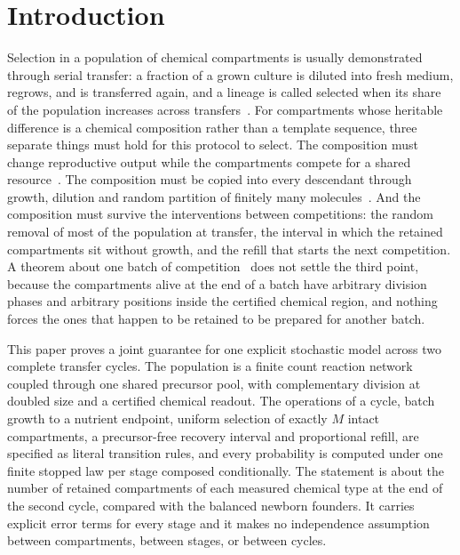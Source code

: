 \documentclass[11pt,a4paper]{article}
\theoremstyle{plain}
\theoremstyle{definition}
\theoremstyle{remark}
\begin{document}
\section{Introduction}\label{sec:intro}

Selection in a population of chemical compartments is usually demonstrated through serial transfer: a fraction of a grown culture is diluted into fresh medium, regrows, and is transferred again, and a lineage is called selected when its share of the population increases across transfers~\citep{mills1967,lincoln2009}. For compartments whose heritable difference is a chemical composition rather than a template sequence, three separate things must hold for this protocol to select. The composition must change reproductive output while the compartments compete for a shared resource~\citep{chen2004,adamala2013,lu2024,zwicker2017}. The composition must be copied into every descendant through growth, dilution and random partition of finitely many molecules~\citep{segre2000,vasas2010,virgo2015}. And the composition must survive the interventions between competitions: the random removal of most of the population at transfer, the interval in which the retained compartments sit without growth, and the refill that starts the next competition. A theorem about one batch of competition~\citep{batch2026} does not settle the third point, because the compartments alive at the end of a batch have arbitrary division phases and arbitrary positions inside the certified chemical region, and nothing forces the ones that happen to be retained to be prepared for another batch.

This paper proves a joint guarantee for one explicit stochastic model across two complete transfer cycles. The population is a finite count reaction network coupled through one shared precursor pool, with complementary division at doubled size and a certified chemical readout. The operations of a cycle, batch growth to a nutrient endpoint, uniform selection of exactly $M$ intact compartments, a precursor-free recovery interval and proportional refill, are specified as literal transition rules, and every probability is computed under one finite stopped law per stage composed conditionally. The statement is about the number of retained compartments of each measured chemical type at the end of the second cycle, compared with the balanced newborn founders. It carries explicit error terms for every stage and it makes no independence assumption between compartments, between stages, or between cycles.
\end{document}

